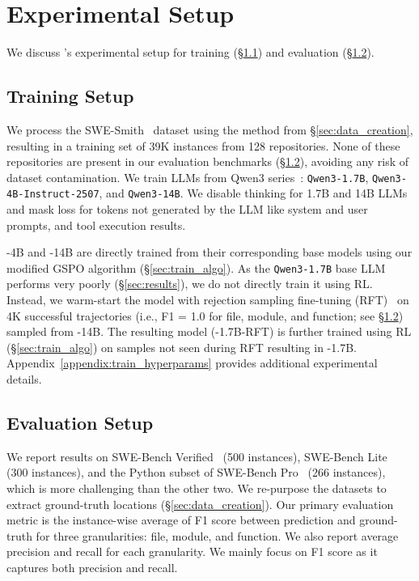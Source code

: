 
\section{Experimental Setup}
\label{sec:experiments}

We discuss \methodname's experimental setup for training (\S\ref{sec:train_setup}) and evaluation (\S\ref{sec:eval_benchmarks}).

\subsection{Training Setup}\label{sec:train_setup}
We process the SWE-Smith~\citep{yang2025swesmithscalingdatasoftware} dataset using the method from \S\ref{sec:data_creation}, resulting in a training set of 39K instances from 128 repositories. None of these repositories are present in our evaluation benchmarks (\S\ref{sec:eval_benchmarks}), avoiding any risk of dataset contamination. We train LLMs from Qwen3 series~\citep{yang2025qwen3technicalreport}: \texttt{Qwen3-1.7B}, \texttt{Qwen3-4B-Instruct-2507}, and \texttt{Qwen3-14B}. We disable thinking for 1.7B and 14B LLMs and mask loss for tokens not generated by the LLM like system and user prompts, and tool execution results.

\methodname-4B and \methodname-14B are directly trained from their corresponding base models using our modified GSPO algorithm (\S\ref{sec:train_algo}). As the \texttt{Qwen3-1.7B} base LLM performs very poorly (\S\ref{sec:results}), we do not directly train it using RL. Instead, we warm-start the model with rejection sampling fine-tuning (RFT)~\citep{yuan2023scalingrelationshiplearningmathematical} on 4K successful trajectories (i.e., F1 = 1.0 for file, module, and function; see \S\ref{sec:eval_benchmarks}) sampled from \methodname-14B. The resulting model (\methodname-1.7B-RFT) is further trained using RL (\S\ref{sec:train_algo}) on samples not seen during RFT resulting in \methodname-1.7B. Appendix~\ref{appendix:train_hyperparams} provides additional experimental details. 
\subsection{Evaluation Setup}\label{sec:eval_benchmarks}

We report results on SWE-Bench Verified~\citep{chowdhury2024swebenchverified} (500 instances), SWE-Bench Lite~\citep{jimenez2024swebenchlanguagemodelsresolve} (300 instances), and the Python subset of SWE-Bench Pro~\citep{deng2025swebenchproaiagents} (266 instances), which is more challenging than the other two. We re-purpose the datasets to extract ground-truth locations (\S\ref{sec:data_creation}). Our primary evaluation metric is the instance-wise average of F1 score between prediction and ground-truth for three granularities: file, module, and function. We also report average precision and recall for each granularity. We mainly focus on F1 score as it captures both precision and recall.

